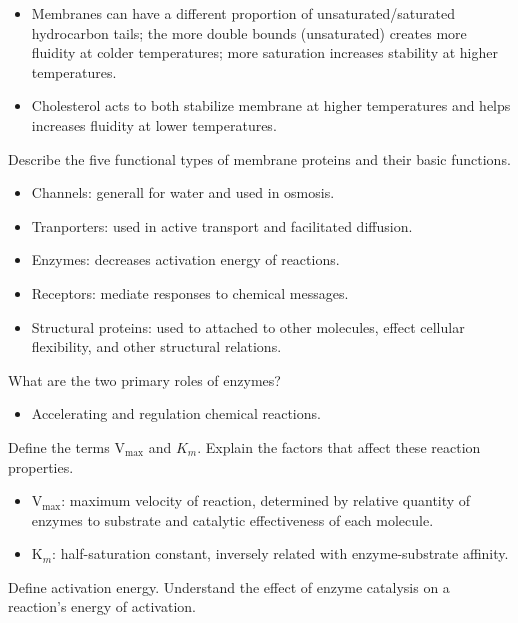 \documentclass[12pt,a4paper]{article}
\begin{document}
\begin{itemize}
\begin{itemize}
            \item Membranes can have a different proportion of unsaturated/saturated hydrocarbon tails; the more double bounds (unsaturated) creates more fluidity at colder temperatures; more saturation increases stability at higher temperatures.
            \item Cholesterol acts to both stabilize membrane at higher temperatures and helps increases fluidity at lower temperatures.
        \end{itemize}
    {\color{G-Moon}\item Describe the five functional types of membrane proteins and their basic functions.}
        \begin{itemize}
            \item Channels: generall for water and used in osmosis. \item Tranporters: used in active transport and facilitated diffusion.
            \item Enzymes: decreases activation energy of reactions.
            \item Receptors: mediate responses to chemical messages.
            \item Structural proteins: used to attached to other molecules, effect cellular flexibility, and other structural relations.
        \end{itemize}
    {\color{G-Moon}\item What are the two primary roles of enzymes?}
        \begin{itemize}
            \item Accelerating and regulation chemical reactions.
        \end{itemize}
    {\color{G-Moon}\item Define the terms V\(_{\text{max}}\) and \(K_m\). Explain the factors that affect these reaction properties.}
        \begin{itemize}
            \item V\(_{\text{max}}\): maximum velocity of reaction, determined by relative quantity of enzymes to substrate and catalytic effectiveness of each molecule.
            \item K\(_{m}\): half-saturation constant, inversely related with enzyme-substrate affinity. 
        \end{itemize}
    {\color{G-Moon}\item Define activation energy. Understand the effect of enzyme catalysis on a reaction’s energy of activation.}
        \begin{itemize}

\end{itemize}
\end{itemize}
\end{document}

